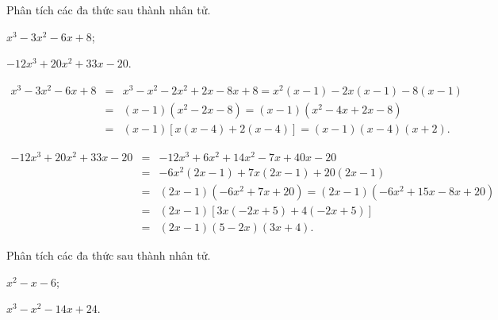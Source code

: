 \begin{vn}
Phân tích các đa thức sau thành nhân tử. 
\begin{enumEX}{2}
\item $x^3-3x^2 - 6x +8$;
\item $-12x^3 + 20x^2 + 33x -20$.
\end{enumEX}
\loigiai
{{\allowdisplaybreaks
\begin{enumEX}{1}
\item \vspace{-0.9cm}
\begin{eqnarray*}
x^3-3x^2 - 6x +8 &=& x^3 - x^2 - 2x^2 + 2x - 8x + 8 = x^2(x-1) - 2x(x-1) -8(x-1) \\
&=& (x-1)(x^2 - 2x - 8) = (x-1)(x^2 - 4x  + 2x - 8) \\
&=& (x-1)\left [x(x-4) + 2(x-4) \right ] = (x-1)(x-4)(x+2).
\end{eqnarray*}
\vspace{-1cm}
\item \vspace{-0.9cm}
\begin{eqnarray*}
-12x^3 + 20x^2 + 33x -20 &=& -12x^3 + 6x^2 + 14x^2 - 7x + 40x - 20 \\
&=& -6x^2(2x-1) +7x(2x-1) +20(2x-1)\\
&=& (2x-1)(-6x^2 + 7x + 20) = (2x-1)(-6x^2 + 15x - 8x + 20)\\
&=& (2x-1)[3x(-2x+5) + 4(-2x+5)] \\
&=& (2x-1)(5-2x)(3x+4).
\end{eqnarray*}
\end{enumEX}}
}
\end{vn}

\begin{vn}
Phân tích các đa thức sau thành nhân tử.
\begin{listEX}[2]
\item $x^2-x-6$;
\item $x^3-x^2-14x+24$.
\end{listEX}
\end{vn}

